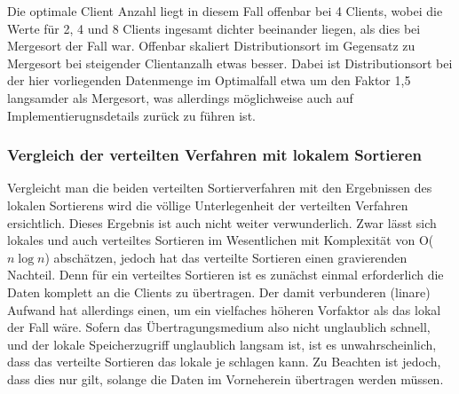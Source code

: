 \documentclass[fontsize=12pt,a4paper,headinclude=no,headings=small]{scrartcl}
\begin{document}
Die optimale Client Anzahl liegt in diesem Fall offenbar bei 4 Clients, wobei die Werte für 2, 4 und 8 Clients ingesamt dichter beeinander liegen, als dies bei Mergesort der Fall war. Offenbar skaliert Distributionsort im Gegensatz zu Mergesort bei steigender Clientanzalh etwas besser. Dabei ist Distributionsort bei der hier vorliegenden Datenmenge im Optimalfall etwa um den Faktor 1,5 langsamder als Mergesort, was allerdings möglichweise auch auf Implementierugnsdetails zurück zu führen ist.

\subsubsection{Vergleich der verteilten Verfahren mit lokalem Sortieren}
Vergleicht man die beiden verteilten Sortierverfahren mit den Ergebnissen des lokalen Sortierens wird die völlige Unterlegenheit der verteilten Verfahren ersichtlich. Dieses Ergebnis ist auch nicht weiter verwunderlich. Zwar lässt sich lokales und auch verteiltes Sortieren im Wesentlichen mit Komplexität von O($n \log n$) abschätzen, jedoch hat das verteilte Sortieren einen gravierenden Nachteil. Denn für ein verteiltes Sortieren ist es zunächst einmal erforderlich die Daten komplett an die Clients zu übertragen. Der damit verbunderen (linare) Aufwand hat allerdings einen, um ein vielfaches höheren Vorfaktor als das lokal der Fall wäre. Sofern das Übertragungsmedium also nicht unglaublich schnell, und der lokale Speicherzugriff unglaublich langsam ist, ist es unwahrscheinlich, dass das verteilte Sortieren das lokale je schlagen kann. Zu Beachten ist jedoch, dass dies nur gilt, solange die Daten im Vorneherein übertragen werden müssen.
 
\end{document}
